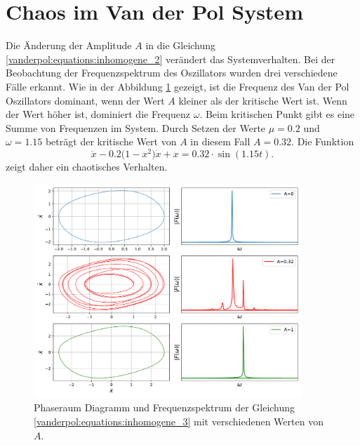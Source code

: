 \section{Chaos im Van der Pol System\label{vanderpol:section:chaos}}
%

Die Änderung der Amplitude $A$ in die Gleichung \eqref{vanderpol:equations:inhomogene_2} verändert das Systemverhalten. Bei der Beobachtung der Frequenzspektrum des Oszillators wurden drei verschiedene Fälle erkannt. Wie in der Abbildung \ref{vanderpol:figures:fft} gezeigt, ist die Frequenz des Van der Pol Oszillators dominant, wenn der Wert $A$ kleiner als der kritische Wert ist. Wenn der Wert höher ist, dominiert die Frequenz $\omega$.
Beim kritischen Punkt gibt es eine Summe von Frequenzen im System.
%
Durch Setzen der Werte $\mu=0.2$ und $\omega=1.15$ beträgt der kritische Wert von $A$ in diesem Fall $A=0.32$. Die Funktion 
\begin{equation}
	\ddot{x}-0.2\bigl(1-x^{2}\bigr) \dot{x}+x = 0.32 \cdot \sin(1.15 t).
	\label{vanderpol:equations:inhomogene_3}
\end{equation}
zeigt daher ein chaotisches Verhalten.
\begin{figure}
	\centering
	\includegraphics[width=0.9\textwidth]{papers/vanderpol/figures/fft_plot2.pdf}
	\caption{Phaseraum Diagramm und Frequenzspektrum der Gleichung \eqref{vanderpol:equations:inhomogene_3} mit verschiedenen Werten von $A$.\label{vanderpol:figures:fft}}
\end{figure}

